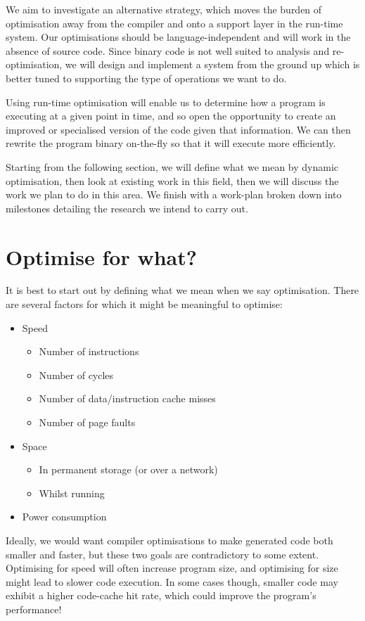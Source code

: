 \documentclass[11pt,letterpaper,onecolumn,notitlepage]{article}
\begin{document}
We aim to investigate an alternative strategy, which moves the burden of optimisation away from the compiler and onto a support layer in the run-time system. Our optimisations should be language-independent and will work in the absence of source code. Since binary code is not well suited to analysis and re-optimisation, we will design and implement a system from the ground up which is better tuned to supporting the type of operations we want to do.

Using run-time optimisation will enable us to determine how a program is executing at a given point in time, and so open the opportunity to create an improved or specialised version of the code given that information. We can then rewrite the program binary on-the-fly so that it will execute more efficiently.

Starting from the following section, we will define what we mean by dynamic optimisation, then look at existing work in this field, then we will discuss the work we plan to do in this area. We finish with a work-plan broken down into milestones detailing the research we intend to carry out.

\section{Optimise for what?}

It is best to start out by defining what we mean when we say optimisation. There are several factors for which it might be meaningful to optimise:

\begin{itemize}
\item Speed
  \begin{itemize}
  \item Number of instructions
  \item Number of cycles
  \item Number of data/instruction cache misses
  \item Number of page faults
  \end{itemize}
\item Space
  \begin{itemize}
  \item In permanent storage (or over a network)
  \item Whilst running
  \end{itemize}
\item Power consumption
\end{itemize}

Ideally, we would want compiler optimisations to make generated code both smaller and faster, but these two goals are contradictory to some extent. Optimising for speed will often increase program size, and optimising for size might lead to slower code execution. In some cases though, smaller code may exhibit a higher code-cache hit rate, which could improve the program's performance!
\end{document}
